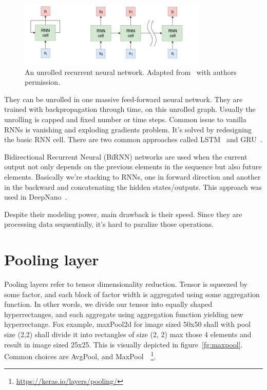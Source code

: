 \documentclass[times, utf8, diplomski, english]{fer}
\begin{document}
\begin{figure}[!ht]
    \begin{center}
        \includegraphics[width=0.8\textwidth]{rnn}
        \caption{An unrolled recurrent neural network. Adapted from~\citep{mratkovic} with authors permission.}
        \label{fg:rnn}
    \end{center}
\end{figure}


They can be unrolled in one massive feed-forward neural network. They are trained with backpropagation through time, on this unrolled graph. Usually the unrolling is capped and fixed number or time steps. 
Common issue to vanilla RNNs is vanishing and exploding gradients problem. It's solved by redesigning the basic RNN cell. There are two common approaches called LSTM~\citep{hochreiter1997long} and GRU~\citep{gru}.

Bidirectional Recurrent Neural (BiRNN) networks are used when the current output not only depends on the previous elements in the sequence but also future elements. Basically we're stacking to RNNs, one in forward direction and another in the backward and concatenating the hidden states/outputs. This approach was used in DeepNano~\citep{Boza2017}.

Despite their modeling power, main drawback is their speed. Since they are processing data sequentially, it's hard to paralize those operations. 

\section{Pooling layer}
Pooling layers refer to tensor dimensionality reduction. Tensor is squeezed by some factor, and each block of factor width is aggregated using some aggregation function. 
In other words, we divide our tensor into equally shaped hyperrectanges, and each aggregate using aggregation function yielding new hyperrectange. 
Fox example, maxPool2d for  image sized 50x50 shall with pool size (2,2) shall divide it into rectangles of size (2, 2) max those 4 elements and result in image sized 25x25.
This is visually depicted in figure~\ref{fg:maxpool}.
Common choices are AvgPool, and MaxPool~\citep{Scherer:2010:EPO:1886436.1886447}~\footnote{\url{https://keras.io/layers/pooling/}}.
\end{document}
